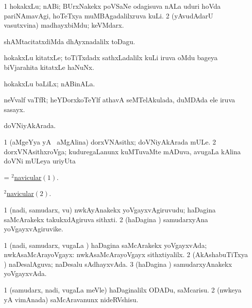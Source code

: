\bentry
{}
\gl{\nA}
\bmng
\bnum
\num{1} hokakxLu; nABi; BUrxNakekx poVSaNe odagisuva nALa uduri hoVda pariNAmavAgi, hoTeTxya muMBAgadalilxruva kuLi. 
\num{2} (yAvudAdarU vasutxvina) madhayxbiMdu; keVMdarx. 
\enum
\emng

\noindent
\gl{\pagu}
\bmng
{} shAMtacitatxdiMda dhAyxnadalilx toDagu. 
\emng
\eentry

\bentry
{}
\gl{\nA}
\bmng
hokakxLu kitatxLe; toTiTxdadx sathxLadalilx kuLi iruva oMdu bageya biVjarahita kitatxLe haNuNx. 
\emng
\eentry

\bentry
{}
\gl{\nA}
\bmng
hokakxLu baLiLx; nABinALa. 
\emng
\eentry

\bentry
{}
\gl{\nA}
\bmng
neVvalf vaTfR; heYDorxkoTeYlf athavA seMTelAkulada, duMDAda ele iruva sasayx. 
\emng
\eentry

\bentry
{}
\gl{\gu}
\bmng
doVNiyAkArada. 
\emng
\eentry

\bentry
{}
\gl{\nA}
\bmng
\bnum
\num{1} (aMgeYya yA \sA\ aMgAlina) dorxVNAsithx; doVNiyAkArada mULe. 
\hypertarget{navicular(2)2}{} 
\num{2} dorxVNAsithxroVga; kuduregaLanunx kuMTuvaMte mADuva, avugaLa kAlina doVNi mULeya uriyUta 
\enum
\emng
\eentry

\bentry
{}
\gl{\nA}
\bmng
= \hyperlink{navicular(2)}{$^2$navicular\((1)\)}. 
\emng
\eentry

\bentry
{}
\gl{\nA}
\bmng
\hyperlink{navicular(2)2}{$^2$navicular\((2)\)}. 
\emng
\eentry

\bentry
{}
\gl{\nA}
\bmng
\bnum
\num{1} (nadi, samudarx, \mo vu) nwkAyAnakekx yoVgayxvAgiruvudu; haDagina saMcArakekx takukxdAgiruva sithxti. 
\num{2} (haDagina \vi) samudarxyAna yoVgayxvAgiruvike. 
\enum
\emng
\eentry

\bentry
{}
\gl{\gu}
\bmng
\bnum
\num{1} (nadi, samudarx, \mo vugaLa \vi) haDagina saMcArakekx yoVgayxvAda; nwkAsaMcArayoVgayx:  nwkAsaMcArayoVgayx sithxtiyalilx. 
\num{2} (AkAshabuTiTxya \vi) naDesalAguva; naDesalu sAdhayxvAda. 
\num{3} (haDagina \vi) samudarxyAnakekx yoVgayxvAda. 
\enum
\emng
\eentry

\bentry
{}
\gl{\sakirx}
\bmng
\bnum
\num{1} (samudarx, nadi, \mo vugaLa meVle) haDaginalilx ODADu, saMcarisu. 
\num{2} (nwkeya yA vimAnada) saMcAravanunx nideRVshisu. 
\enum
\emng

